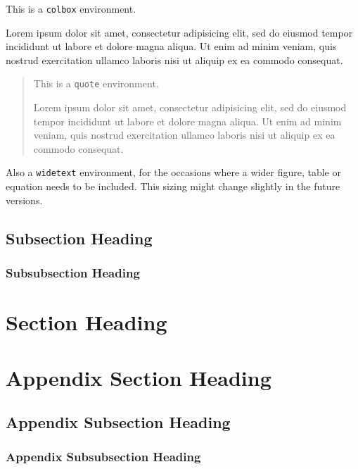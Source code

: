 \documentclass[11pt]{cauchy}
\begin{document}
\begin{colbox}
  This is a \texttt{colbox} environment.

  Lorem ipsum dolor sit amet, consectetur adipisicing elit, sed do eiusmod tempor incididunt ut labore et dolore magna aliqua. Ut enim ad minim veniam, quis nostrud exercitation ullamco laboris nisi ut aliquip ex ea commodo consequat.
\end{colbox}

\begin{quote}
  This is a \texttt{quote} environment.
  
  Lorem ipsum dolor sit amet, consectetur adipisicing elit, sed do eiusmod tempor incididunt ut labore et dolore magna aliqua. Ut enim ad minim veniam, quis nostrud exercitation ullamco laboris nisi ut aliquip ex ea commodo consequat.
\end{quote}

Also a \texttt{widetext} environment, for the occasions where a wider figure, table or equation needs to be included. This sizing might change slightly in the future versions.
\begin{widetext}
  \lipsum[33]
\end{widetext}

\subsection{Subsection Heading}
\lipsum[21-33]

  \subsubsection{Subsubsection Heading}
  \lipsum[22-34]

\section{Section Heading}
\lipsum[13-23]

\appendix
\section{Appendix Section Heading}
\lipsum[11-22]

\subsection{Appendix Subsection Heading}
\lipsum[12-25]

  \subsubsection{Appendix Subsubsection Heading}
  \lipsum[13-31]

\nocite{*}
{\small }

\backmatter

\end{document}
